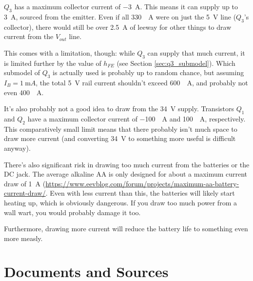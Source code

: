 \documentclass{article}
\newcommand{\Vout}{$V_{out}$}
\begin{document}
$Q_3$ has a maximum collector current of \qty{-3}{A}. This means it
can supply up to \qty{3}{A}, sourced from the emitter. Even if all
\qty{330}{\milli{}A} were on just the \qty{5}{\volt} line ($Q_3$'s
collector), there would still be over \qty{2.5}{A} of leeway for other
things to draw current from the \Vout{} line.

This comes with a limitation, though: while $Q_3$ can supply that much
current, it is limited further by the value of $h_{FE}$ (see Section
\ref{sec:q3_submodel}). Which submodel of $Q_3$ is actually used is
probably up to random chance, but assuming $I_B = \qty{1}{\milli{}A}$,
the total \qty{5}{\volt} rail current shouldn't exceed
\qty{600}{\milli{}A}, and probably not even \qty{400}{\milli{}A}.

It's also probably not a good idea to draw from the \qty{34}{\volt}
supply. Transistors $Q_1$ and $Q_2$ have a maximum collector current
of \qty{-100}{\milli{}A} and \qty{100}{\milli{}A}, respectively. This
comparatively small limit means that there probably isn't much space
to draw more current (and converting \qty{34}{\volt} to something more
useful is difficult anyway).

There's also significant risk in drawing too much current from the
batteries or the DC jack. The average alkaline AA is only designed for
about a maximum current draw of \qty{1}{A}
(\url{https://www.eevblog.com/forum/projects/maximum-aa-battery-current-draw/}. Even
with less current than this, the batteries will likely start heating
up, which is obviously dangerous. If you draw too much power from a
wall wart, you would probably damage it too.

Furthermore, drawing more current will reduce the battery life to
something even more measly.

\section{Documents and Sources}
\label{sec:documents}
\end{document}
